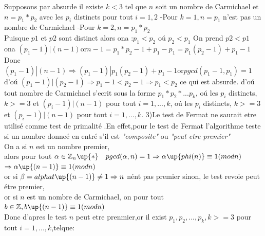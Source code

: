 \documentclass[10pt]{beamer}
\begin{document}
\begin{frame}
Supposons par absurde il existe $k<3$ tel que $n$ soit un nombre de Carmichael et $n = p_{1}*p_{2}$ avec les $p_{i}$ distincts  pour tout $i=1,2$
-Pour $k = 1, n = p_{1}$ n'est pas un nombre de Carmichael
-Pour $k = 2,n = p_{1}*p_{2}$
\\Puisque $p1$ et $p2$ sont distinct alors ona :$p_{1}<p_{2}$ o\'{u} $p_{2}<p_{1}$
On prend $p2<p1$
ona $(p_{1}-1)|(n-1) \text{or} n-1 = p_{1}*p_{2} - 1 + p_{1} - p_{1} = p_{1}(p_{2}-1) + p_{1} - 1$
\\Donc $(p_{1}-1)|(n-1) \Rightarrow (p_{1}-1)|p_{1}(p_{2}-1) + p_{1} - 1 \text{or} pgcd(p_{1}-1,p_{1}) = 1$
\\d'o\'{u} $(p_{1}-1)|(p_{2}-1) \Rightarrow p_{1}-1 < p_{2}-1 \Rightarrow p_{1} < p_{2}$ ce qui est absurde.
d'o\'{u} tout nombre de Carmichael s'ecrit sous la forme $p_{1}*p_{2}*...p_{k}$, o\'{u} les $p_{i}$ distincts, $k>=3$ et $(p_{i}-1)|(n-1)$ pour tout $i=1,...,k$, o\'{u} les $p_{i}$ distincts, $k>=3$ et $(p_{i}-1)|(n-1)$ pour tout $i=1,...,k$.
3)Le test de Fermat  ne saurait etre utilis\'{e} comme test de primalit\'{e} .En effet,pour le test de Fermat l'algorithme teste si un nombre 
donne\'{e} en entr\'{e}  s'il est \emph{"composite"} ou \emph{"peut etre premier"}
\\On a si $n$ est un nombre premier, 
\\alors pour tout $\alpha \in \mathbb{Z}_{n}\up{*} \quad pgcd(\alpha,n) = 1 \Rightarrow \alpha\up{phi(n)} \equiv 1 (mod n)$
\\$ \Rightarrow \alpha\up{(n-1)} \equiv 1 (mod n)$
\\or si $\beta = alphat\up{(n-1)} \neq 1 \Rightarrow n$ n\'{e}nt pas premier sinon, 
le test revoie peut \'{e}tre premier, 
\\or si $n$ est un nombre de Carmichael, on pour tout $b \in \mathbb{Z} , b\up{(n-1)} \equiv 1 (mod n)$
\\Donc d'apres le test $n$ peut etre prenmier,or il exist $p_{1},p_{2},...,p_{k},k>=3$ pour tout $i=1,...,k$,telque:


\end{frame}
\end{document}

